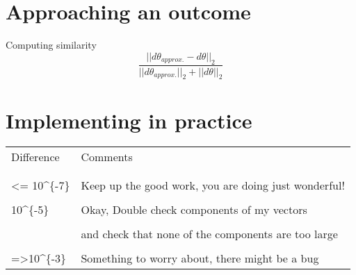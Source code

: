 \documentclass{article}
\begin{document}
\maketitle
\section{Approaching an outcome}

Computing similarity
$$\frac{||d\theta_{approx.} - d\theta||_2}{||d\theta_{approx.}||_2 + ||d\theta||_2}$$

\maketitle
\section{Implementing in practice}

\begin{table}[]
\begin{tabular}{ll}
Difference                               & Comments                                             \\
                \\
                \\
\textless{}= 10\textasciicircum{}\{-7\}  & Keep up the good work, you are doing just wonderful! \\
                \\
10\textasciicircum{}\{-5\}               & Okay, Double check components of my vectors          \\
                  \\
                                         & and check that none of the components are too large  \\
                                                        \\
=\textgreater 10\textasciicircum{}\{-3\} & Something to worry about, there might be a bug      
\end{tabular}
\end{table}
\end{document}
